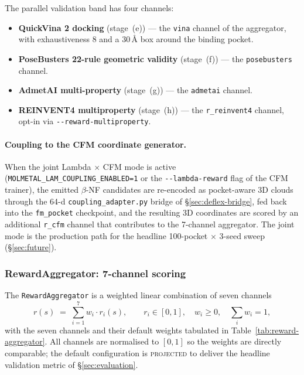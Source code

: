 The parallel validation band has four channels:

\begin{itemize}
  \item \textbf{QuickVina 2 docking} (stage~(e)) --- the
        \texttt{vina} channel of the aggregator, with
        exhaustiveness $8$ and a 30\,\AA{} box around the
        binding pocket.
  \item \textbf{PoseBusters 22-rule geometric validity}
        (stage~(f)) --- the \texttt{posebusters} channel.
  \item \textbf{AdmetAI multi-property} (stage~(g)) --- the
        \texttt{admetai} channel.
  \item \textbf{REINVENT4 multiproperty} (stage~(h)) --- the
        \texttt{r\_reinvent4} channel, opt-in via
        \texttt{-{}-reward-multiproperty}.
\end{itemize}

\paragraph{Coupling to the CFM coordinate generator.}
When the joint Lambda $\times$ CFM mode is active
(\texttt{MOLMETAL\_LAM\_COUPLING\_ENABLED=1} or the
\texttt{-{}-lambda-reward} flag of the CFM trainer), the
emitted $\beta$-NF candidates are re-encoded as pocket-aware
3D clouds through the 64-d \texttt{coupling\_adapter.py}
bridge of \S\ref{sec:deflex-bridge}, fed back into the
\texttt{fm\_pocket} checkpoint, and the resulting 3D
coordinates are scored by an additional \texttt{r\_cfm}
channel that contributes to the 7-channel aggregator.  The
joint mode is the production path for the headline
100-pocket $\times$ 3-seed sweep (\S\ref{sec:future}).

\subsubsection{RewardAggregator: 7-channel scoring}
\label{sec:end-to-end-reward}

The \texttt{RewardAggregator} is a weighted linear
combination of seven channels
\begin{equation}
  \label{eq:reward-aggregator}
  r(s) \;=\; \sum_{i=1}^{7} w_i \cdot r_i(s), \qquad
  r_i \in [0,1], \quad w_i \ge 0, \quad \sum_i w_i = 1,
\end{equation}
with the seven channels and their default weights tabulated
in Table~\ref{tab:reward-aggregator}.  All channels are
normalised to $[0,1]$ so the weights are directly
comparable; the default configuration is
\textsc{projected} to deliver the headline validation
metric of \S\ref{sec:evaluation}.

